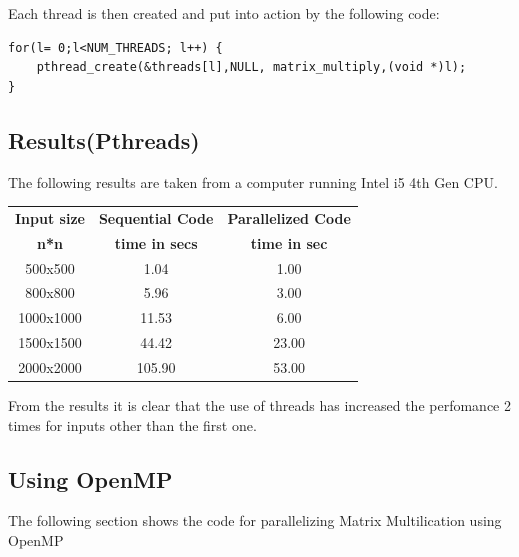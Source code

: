 \documentclass{article}
\newcommand{\head}[1]{\textnormal{\textbf{#1}}}
\begin{document}
Each thread is then created and put into action by the following code:

\begin{lstlisting}
for(l= 0;l<NUM_THREADS; l++) {
	pthread_create(&threads[l],NULL, matrix_multiply,(void *)l); 
}
\end{lstlisting}

\subsection{Results(Pthreads)}

The following results are taken from a computer running Intel i5 4th Gen CPU.
\newline
\newline
\begin{tabular}{|c|c|c|}
\hline
\head{Input size}&\head{Sequential Code}&\head{Parallelized Code}\\
\head{n*n}&\head{time in secs}&\head{time in sec}\\
\hline
500x500 & 1.04 & 1.00\\
\hline
800x800 & 5.96 & 3.00\\
\hline
1000x1000 & 11.53 & 6.00\\
\hline
1500x1500 & 44.42 & 23.00\\
\hline
2000x2000 & 105.90 & 53.00\\
\hline
\end{tabular}\newline
\newline
\newline
From the results it is clear that the use of threads has increased the perfomance 2 times for inputs other than the first
one. 

\subsection{Using OpenMP}


The following section shows the code for parallelizing Matrix Multilication using OpenMP
\end{document}
